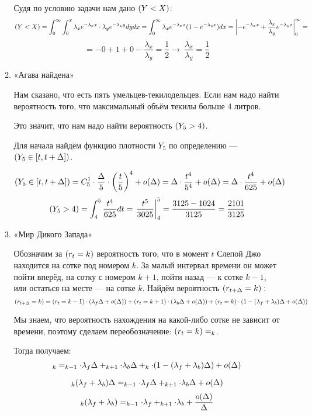 \documentclass[11pt, a4paper]{article}
\let\P\relax
\DeclareMathOperator{\P}{\mathbb{P}}
\theoremstyle{definition}
\begin{document}
\begin{enumerate}
\begin{enumerate}
    Судя по условию задачи нам дано $\P(Y < X)$:
    \[
    \P(Y < X) = \int_0^{\infty} \int_0^x \lambda_x e^{-\lambda_x x} \cdot \lambda_y e^{- \lambda_y y}dy dx = \int_0^{\infty} \lambda_x e^{-\lambda_x x} (1 - e^{- \lambda_y x})dx =
    \left|
    -e^{-\lambda_x x} + \frac{\lambda_x}{\lambda_y} e^{-\lambda_y x} \right|_{0}^{\infty} = 
    \]
    \[
    = -0 + 1 + 0 - \frac{\lambda_x}{\lambda_y} = \frac{1}{2} \longrightarrow \ \frac{\lambda_x}{\lambda_y} = \frac{1}{2} 
    \]
    \item «Агава найдена»
    
    Нам сказано, что есть пять умельцев-текилодельцев. Если нам надо найти вероятность того, что максимальный объём текилы больше 4 литров.
    
    Это значит, что нам надо найти вероятность $\P(Y_5 > 4)$. 
    
    Для начала найдём функцию плотности $Y_5$ по определению — $ \P(Y_5 \in [t, t + \Delta])$.
    
    \[
    \P(Y_5 \in [t, t + \Delta]) = C_5^1\cdot  \frac{\Delta}{5}\cdot \left(\frac{t}{5}\right)^4
     + o(\Delta) = \Delta \cdot \frac{t^4}{5^4} + o(\Delta) = \Delta \cdot \frac{t^4}{625} + o(\Delta)
    \]
    \[ 
    \P(Y_5 > 4) = \int_4^5 \frac{t^4}{625} dt = \left. \frac{t^5}{3025} \right|_4^5 = \frac{3125 - 1024}{3125} = \frac{2101}{3125}
    \]
    \item «Мир Дикого Запада»
    
    Обозначим за $\P(r_t = k)$ вероятность того, что в момент $t$ Слепой Джо находится на сотке под номером $k$. За малый интервал времени он может пойти вперёд, на сотку с номером $k+1$, пойти назад — к сотке $k-1$, или остаться на месте — на сотке $k$. Найдём вероятность $\P(r_{t+\Delta} = k):$
    \[
    \P(r_{t+\Delta} = k) = \P(r_t = k-1)\cdot (\lambda_f \Delta + o(\Delta)) + 
    \P(r_t = k+1)\cdot (\lambda_b \Delta + o(\Delta)) + \P(r_t = k)\cdot (1-(\lambda_f + \lambda_b)\Delta + o(\Delta)) \]
    
    Мы знаем, что вероятность нахождения на какой-либо сотке не зависит от времени, поэтому сделаем переобозначение: $\P(r_t = k) = \P_k$.
    
    Тогда получаем:
    \[
    \P_k = \P_{k-1}\cdot \lambda_f \Delta + \P_{k+1} \cdot \lambda_b \Delta + \P_k \cdot (1-(\lambda_f + \lambda_b)\Delta) + o(\Delta)
    \]
    
    \[
    \P_k (\lambda_f + \lambda_b)\Delta = \P_{k-1}\cdot \lambda_f \Delta + \P_{k+1} \cdot \lambda_b \Delta  + o(\Delta)
    \]
    \[
    \P_k (\lambda_f + \lambda_b) = \P_{k-1}\cdot \lambda_f + \P_{k+1} \cdot \lambda_b + \frac{o(\Delta)}{\Delta}
    \]
    

\end{enumerate}
\end{enumerate}
\end{document}
